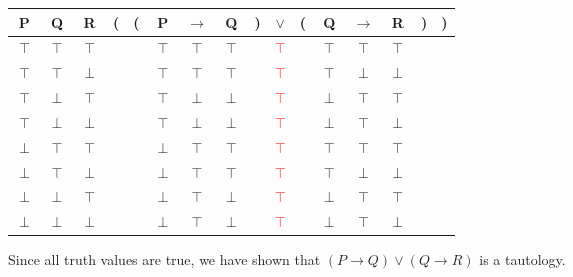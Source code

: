 \documentclass[12pt]{article}
\begin{document}
	\begin{tabular}{ c  c  c | c  c  c  c  c  c  c  c  c  c  c  c  c }
		P & Q & R & ( & ( & P & $\rightarrow$ & Q & ) & $\lor$ & ( & Q & $\rightarrow$ & R & ) & )\\
		\hline 
		$\top$ & $\top$ & $\top$ &  &  & $\top$ & $\top$ & $\top$ &  & \textcolor{red}{$\top$} &  & $\top$ & $\top$ & $\top$ &  & \\
		$\top$ & $\top$ & $\perp$ &  &  & $\top$ & $\top$ & $\top$ &  & \textcolor{red}{$\top$} &  & $\top$ & $\perp$ & $\perp$ &  & \\
		$\top$ & $\perp$ & $\top$ &  &  & $\top$ & $\perp$ & $\perp$ &  & \textcolor{red}{$\top$} &  & $\perp$ & $\top$ & $\top$ &  & \\
		$\top$ & $\perp$ & $\perp$ &  &  & $\top$ & $\perp$ & $\perp$ &  & \textcolor{red}{$\top$} &  & $\perp$ & $\top$ & $\perp$ &  & \\
		$\perp$ & $\top$ & $\top$ &  &  & $\perp$ & $\top$ & $\top$ &  & \textcolor{red}{$\top$} &  & $\top$ & $\top$ & $\top$ &  & \\
		$\perp$ & $\top$ & $\perp$ &  &  & $\perp$ & $\top$ & $\top$ &  & \textcolor{red}{$\top$} &  & $\top$ & $\perp$ & $\perp$ &  & \\
		$\perp$ & $\perp$ & $\top$ &  &  & $\perp$ & $\top$ & $\perp$ &  & \textcolor{red}{$\top$} &  & $\perp$ & $\top$ & $\top$ &  & \\
		$\perp$ & $\perp$ & $\perp$ &  &  & $\perp$ & $\top$ & $\perp$ &  & \textcolor{red}{$\top$} &  & $\perp$ & $\top$ & $\perp$ &  & \\
	\end{tabular}

	Since all truth values are true, we have shown that $(P \rightarrow Q) \lor (Q \rightarrow R)$ is a tautology.
	
	
	
	
	
	
	
	
\end{document}
